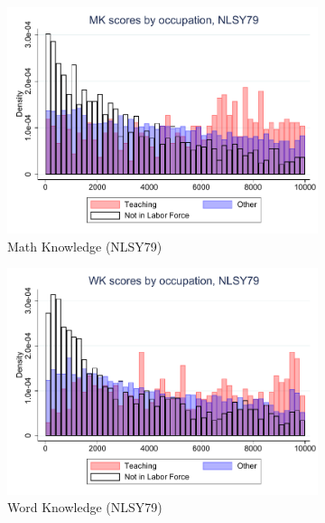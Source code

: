 \documentclass[onehalfspacing,11pt]{article}
\begin{document}
\begin{figure}
	\begin{subfigure}{0.49\textwidth}
		\includegraphics[width=\linewidth]{NLSY79_MK_occ.pdf}
		\caption{Math Knowledge (NLSY79)} \label{fig:nlsy79math}
	\end{subfigure}
	\hspace*{\fill} %
	\begin{subfigure}{0.49\textwidth}
		\includegraphics[width=\linewidth]{NLSY79_WK_occ.pdf}
		\caption{Word Knowledge (NLSY79)} \label{fig:nlsy79word}
	\end{subfigure}
		\begin{subfigure}{0.49\textwidth}

\end{subfigure}
\end{figure}
\end{document}
